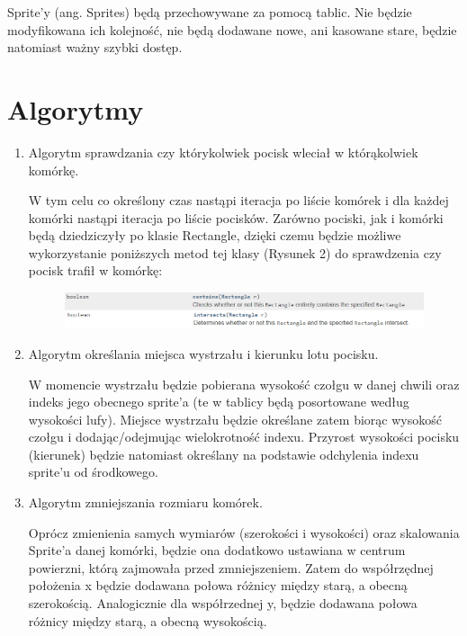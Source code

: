 \documentclass{article}
\begin{document}
Sprite'y (ang. Sprites) będą przechowywane za pomocą tablic. Nie będzie modyfikowana ich kolejność, nie będą dodawane nowe, ani kasowane stare, będzie natomiast ważny szybki dostęp.


\section{Algorytmy}

\begin{enumerate}
    \item Algorytm sprawdzania czy którykolwiek pocisk wleciał w którąkolwiek komórkę.

W tym celu co określony czas nastąpi iteracja po liście komórek i dla każdej komórki nastąpi iteracja po liście pocisków.
Zarówno pociski, jak i komórki będą dziedziczyły po klasie Rectangle, dzięki czemu będzie możliwe wykorzystanie poniższych metod tej klasy (Rysunek 2) do sprawdzenia czy pocisk trafił w komórkę:

\begin{figure} [hbt!]
    \centering
    \includegraphics[width=13cm]{javaDoc.png}
\end{figure}


 \item Algorytm określania miejsca wystrzału i kierunku lotu pocisku.
 
 W momencie wystrzału będzie pobierana wysokość czołgu w danej chwili oraz indeks jego obecnego sprite'a (te w tablicy będą posortowane według wysokości lufy). Miejsce wystrzału będzie określane zatem biorąc wysokość czołgu i dodając/odejmując wielokrotność indexu. Przyrost wysokości pocisku (kierunek) będzie natomiast określany na podstawie odchylenia indexu sprite'u od środkowego.
 
 
  \item Algorytm zmniejszania rozmiaru komórek.
  
Oprócz zmienienia samych wymiarów (szerokości i wysokości) oraz skalowania Sprite'a danej komórki, będzie ona dodatkowo ustawiana w centrum powierzni, którą zajmowała przed zmniejszeniem.
Zatem do współrzędnej położenia x będzie dodawana połowa różnicy między starą, a obecną szerokością. Analogicznie dla współrzednej y, będzie dodawana połowa różnicy między starą, a obecną wysokością.
 
\end{enumerate}
\end{document}
